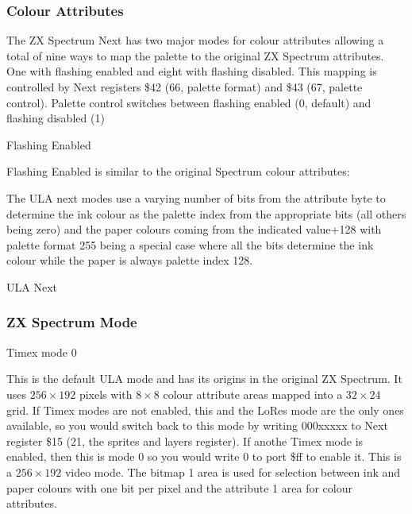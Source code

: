 \subsubsection{Colour Attributes}

The ZX Spectrum Next has two major modes for colour attributes
allowing a total of nine ways to map the palette to the original ZX
Spectrum attributes. One with flashing enabled and eight with flashing
disabled. This mapping is controlled by Next registers \$42 (66,
palette format) and \$43 (67, palette control).  Palette control
switches between flashing enabled (0, default) and flashing disabled
(1)

\begin{table}[h]\centering
  \caption{Flashing Enabled}
\end{table}

Flashing Enabled is similar to the original Spectrum colour attributes:

The ULA next modes use a varying number of bits from the attribute
byte to determine the ink colour as the palette index from the
appropriate bits (all others being zero) and the paper colours coming
from the indicated value+128 with palette format 255 being a special
case where all the bits determine the ink colour while the paper is
always palette index 128.

\begin{table}[h]\centering
  \caption{ULA Next}
\end{table}

\subsubsection{ZX Spectrum Mode}

Timex mode 0

This is the default ULA mode and has its origins in the original ZX
Spectrum. It uses $256\times192$ pixels with $8\times8$ colour
attribute areas mapped into a $32\times24$ grid. If Timex modes are
not enabled, this and the LoRes mode are the only ones available, so
you would switch back to this mode by writing 000xxxxx to Next
register \$15 (21, the sprites and layers register). If anothe Timex
mode is enabled, then this is mode 0 so you would write 0 to port \$ff
to enable it. This is a $256\times192$ video mode. The bitmap 1 area
is used for selection between ink and paper colours with one bit per
pixel and the attribute 1 area for colour attributes.

